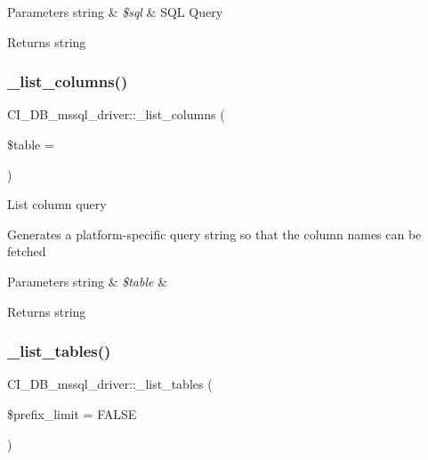 \begin{DoxyParams}[1]{Parameters}
string & {\em \$sql} & S\+QL Query \\
\hline
\end{DoxyParams}
\begin{DoxyReturn}{Returns}
string 
\end{DoxyReturn}
\mbox{\label{class_c_i___d_b__mssql__driver_abd90cc6feb9ad6812724b30a83cd1d52}} 
\subsubsection{\texorpdfstring{\+\_\+list\+\_\+columns()}{\_list\_columns()}}
{\footnotesize\ttfamily C\+I\+\_\+\+D\+B\+\_\+mssql\+\_\+driver\+::\+\_\+list\+\_\+columns (\begin{DoxyParamCaption}\item[{}]{\$table = {\ttfamily \textquotesingle{}\textquotesingle{}} }\end{DoxyParamCaption})\hspace{0.3cm}{\ttfamily [protected]}}

List column query

Generates a platform-\/specific query string so that the column names can be fetched


\begin{DoxyParams}[1]{Parameters}
string & {\em \$table} & \\
\hline
\end{DoxyParams}
\begin{DoxyReturn}{Returns}
string 
\end{DoxyReturn}
\mbox{\label{class_c_i___d_b__mssql__driver_a398b4a018852ce4bb8588fb0bdc5a074}} 
\subsubsection{\texorpdfstring{\+\_\+list\+\_\+tables()}{\_list\_tables()}}
{\footnotesize\ttfamily C\+I\+\_\+\+D\+B\+\_\+mssql\+\_\+driver\+::\+\_\+list\+\_\+tables (\begin{DoxyParamCaption}\item[{}]{\$prefix\+\_\+limit = {\ttfamily FALSE} }\end{DoxyParamCaption})\hspace{0.3cm}{\ttfamily [protected]}}

